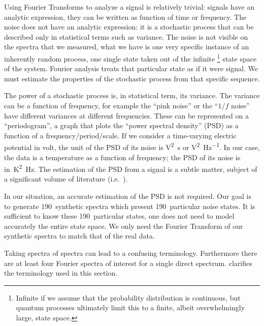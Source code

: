 Using Fourier Transforms to analyze a signal is relatively trivial: signals have an analytic expression, they can be written as function of time or frequency.
The noise does not have an analytic expression: it is a stochastic process that can be described only in statistical terms such as variance.
The noise is not visible on the spectra that we measured, what we have is one very specific instance of an inherently random process, one single state taken out of the infinite%
\footnote{Infinite if we assume that the probability distribution is continuous, but quantum processes ultimately limit this to a finite, albeit overwhelmingly large, state space.}
state space of the system.
Fourier analysis treats that particular state as if it were signal.
We must estimate the properties of the stochastic process from that specific sequence.

The power of a stochastic process is, in statistical term, its variance.
The variance can be a function of frequency, for example the ``pink noise'' or the ``$1/f$ noise'' have different variances at different frequencies.
These can be represented on a ``periodogram'', a graph that plots the ``power spectral density'' (PSD) as a function of a frequency/period/scale.
If we consider a time-varying electric potential in volt,
the unit of the PSD of its noise is \si{\volt\squared\second} or \si{\volt\squared\per\hertz}.
In our case, the data is a temperature as a function of frequency;
the PSD of its noise is in~\si{\kelvin\squared\hertz}.
The estimation of the PSD from a signal is a subtle matter, subject of a significant volume of literature (i.e.\ \textcite{burg1967maximum,percival1993spectral}).

In our situation, an accurate estimation of the PSD is not required.
Our goal is to generate 190~synthetic spectra which present 190~particular noise states.
It is sufficient to know these 190~particular states, one does not need to model accurately the entire state space.
We only need the Fourier Transform of our synthetic spectra to match that of the real data.

Taking spectra of spectra can lead to a confusing terminology.
Furthermore there are at least four Fourier spectra of interest for a single direct spectrum.
 clarifies the terminology used in this section.

